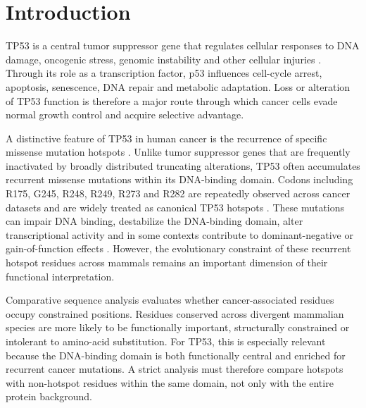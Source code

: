 \documentclass[namedate,webpdf,contemporary,large]{oup-authoring-template}
\begin{document}

\maketitle

\section{Introduction}
TP53 is a central tumor suppressor gene that regulates cellular responses to DNA damage, oncogenic stress, genomic instability and other cellular injuries \citep{olivier2010,joerger2008}. Through its role as a transcription factor, p53 influences cell-cycle arrest, apoptosis, senescence, DNA repair and metabolic adaptation. Loss or alteration of TP53 function is therefore a major route through which cancer cells evade normal growth control and acquire selective advantage.

A distinctive feature of TP53 in human cancer is the recurrence of specific missense mutation hotspots \citep{olivier2010,petitjean2007,olivier2002}. Unlike tumor suppressor genes that are frequently inactivated by broadly distributed truncating alterations, TP53 often accumulates recurrent missense mutations within its DNA-binding domain. Codons including R175, G245, R248, R249, R273 and R282 are repeatedly observed across cancer datasets and are widely treated as canonical TP53 hotspots \citep{olivier2010,petitjean2007,olivier2002}. These mutations can impair DNA binding, destabilize the DNA-binding domain, alter transcriptional activity and in some contexts contribute to dominant-negative or gain-of-function effects \citep{olivier2010,joerger2008}. However, the evolutionary constraint of these recurrent hotspot residues across mammals remains an important dimension of their functional interpretation.

Comparative sequence analysis evaluates whether cancer-associated residues occupy constrained positions. Residues conserved across divergent mammalian species are more likely to be functionally important, structurally constrained or intolerant to amino-acid substitution. For TP53, this is especially relevant because the DNA-binding domain is both functionally central and enriched for recurrent cancer mutations. A strict analysis must therefore compare hotspots with non-hotspot residues within the same domain, not only with the entire protein background.
\end{document}
